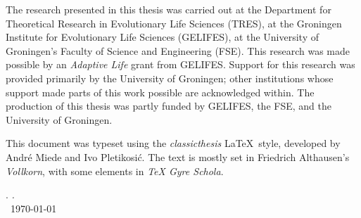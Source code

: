 \thispagestyle{empty}

\hfill

\vfill


\noindent The research presented in this thesis was carried out at the Department for Theoretical Research in Evolutionary Life Sciences (TRES), at the Groningen Institute for Evolutionary Life Sciences (GELIFES), at the University of Groningen's Faculty of Science and Engineering (FSE).
This research was made possible by an \emph{Adaptive Life} grant from GELIFES.
Support for this research was provided primarily by the University of Groningen; other institutions whose support made parts of this work possible are acknowledged within.
The production of this thesis was partly funded by GELIFES, the FSE, and the University of Groningen.

\medskip

\noindent This document was typeset using the \emph{classicthesis} \LaTeX~style, developed by Andr\'e Miede and Ivo Pletikosić.
The text is mostly set in Friedrich Althausen's \emph{Vollkorn}, with some elements in \emph{TeX Gyre Schola}.

\bigskip

\noindent\finalVersionString

\noindent\myName. \textit{\myTitle.}%
\\
\noindent \textcopyright\ \today
